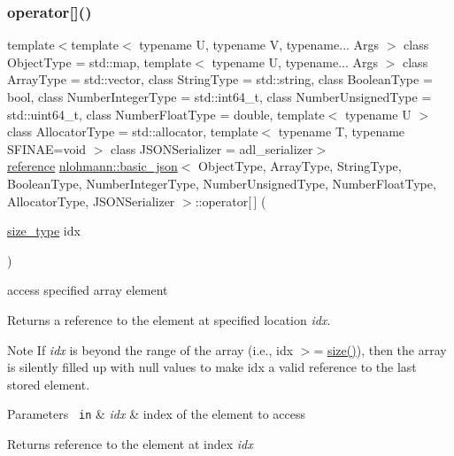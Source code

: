 \subsubsection{\texorpdfstring{operator[]()}{operator[]()}\hspace{0.1cm}{\footnotesize\ttfamily [1/10]}}
{\footnotesize\ttfamily template$<$template$<$ typename U, typename V, typename... Args $>$ class Object\+Type = std\+::map, template$<$ typename U, typename... Args $>$ class Array\+Type = std\+::vector, class String\+Type  = std\+::string, class Boolean\+Type  = bool, class Number\+Integer\+Type  = std\+::int64\+\_\+t, class Number\+Unsigned\+Type  = std\+::uint64\+\_\+t, class Number\+Float\+Type  = double, template$<$ typename U $>$ class Allocator\+Type = std\+::allocator, template$<$ typename T, typename S\+F\+I\+N\+A\+E=void $>$ class J\+S\+O\+N\+Serializer = adl\+\_\+serializer$>$ \\
\mbox{\hyperlink{classnlohmann_1_1basic__json_ac6a5eddd156c776ac75ff54cfe54a5bc}{reference}} \mbox{\hyperlink{classnlohmann_1_1basic__json}{nlohmann\+::basic\+\_\+json}}$<$ Object\+Type, Array\+Type, String\+Type, Boolean\+Type, Number\+Integer\+Type, Number\+Unsigned\+Type, Number\+Float\+Type, Allocator\+Type, J\+S\+O\+N\+Serializer $>$\+::operator\mbox{[}$\,$\mbox{]} (\begin{DoxyParamCaption}\item[{\mbox{\hyperlink{classnlohmann_1_1basic__json_a39f2cd0b58106097e0e67bf185cc519b}{size\+\_\+type}}}]{idx }\end{DoxyParamCaption})\hspace{0.3cm}{\ttfamily [inline]}}



access specified array element 

Returns a reference to the element at specified location {\itshape idx}.

\begin{DoxyNote}{Note}
If {\itshape idx} is beyond the range of the array (i.\+e., {\ttfamily idx $>$= \mbox{\hyperlink{classnlohmann_1_1basic__json_a25e27ad0c6d53c01871c5485e1f75b96}{size()}}}), then the array is silently filled up with {\ttfamily null} values to make {\ttfamily idx} a valid reference to the last stored element.
\end{DoxyNote}

\begin{DoxyParams}[1]{Parameters}
\mbox{\texttt{ in}}  & {\em idx} & index of the element to access\\
\hline
\end{DoxyParams}
\begin{DoxyReturn}{Returns}
reference to the element at index {\itshape idx} 
\end{DoxyReturn}

